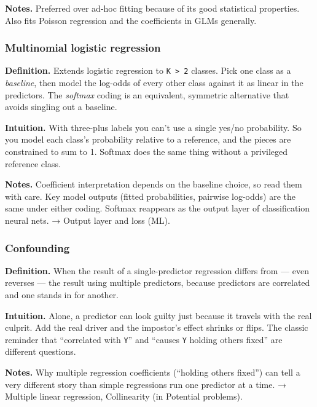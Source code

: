 \documentclass[
  10pt,
  letterpaper,
  onecolumn]{article}
\begin{document}
\textbf{Notes.} Preferred over ad-hoc fitting because of its good
statistical properties. Also fits Poisson regression and the
coefficients in GLMs generally.

\hypertarget{multinomial-logistic-regression}{%
\subsubsection{Multinomial logistic
regression}\label{multinomial-logistic-regression}}

\textbf{Definition.} Extends logistic regression to
\texttt{K\ \textgreater{}\ 2} classes. Pick one class as a
\emph{baseline}, then model the log-odds of every other class against it
as linear in the predictors. The \emph{softmax} coding is an equivalent,
symmetric alternative that avoids singling out a baseline.

\textbf{Intuition.} With three-plus labels you can't use a single yes/no
probability. So you model each class's probability relative to a
reference, and the pieces are constrained to sum to 1. Softmax does the
same thing without a privileged reference class.

\textbf{Notes.} Coefficient interpretation depends on the baseline
choice, so read them with care. Key model outputs (fitted probabilities,
pairwise log-odds) are the same under either coding. Softmax reappears
as the output layer of classification neural nets. → Output layer and
loss (ML).

\hypertarget{confounding}{%
\subsubsection{Confounding}\label{confounding}}

\textbf{Definition.} When the result of a single-predictor regression
differs from --- even reverses --- the result using multiple predictors,
because predictors are correlated and one stands in for another.

\textbf{Intuition.} Alone, a predictor can look guilty just because it
travels with the real culprit. Add the real driver and the impostor's
effect shrinks or flips. The classic reminder that ``correlated with
\texttt{Y}'' and ``causes \texttt{Y} holding others fixed'' are
different questions.

\textbf{Notes.} Why multiple regression coefficients (``holding others
fixed'') can tell a very different story than simple regressions run one
predictor at a time. → Multiple linear regression, Collinearity (in
Potential problems).
\end{document}

